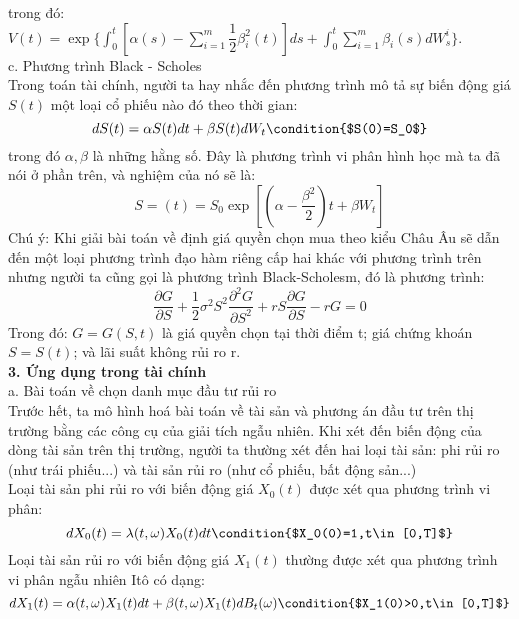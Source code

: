 \documentclass[12pt,a4paper]{article}
\begin{document}
trong đó: $V(t)=\exp\{\int_{0}^{t}[\alpha(s)-\sum_{i=1}^{m}\dfrac{1}{2}\beta_i^2(t)]ds+\int_{0}^{t}\sum_{i=1}^{m}\beta_i(s)dW_s^i \}$.\\
c. Phương trình Black - Scholes\\
Trong toán tài chính, người ta hay nhắc đến phương trình mô tả sự biến động giá $S(t)$ một loại cổ phiếu nào đó theo thời gian:
\begin{equation*}
	dS(t)=\alpha S(t)dt+\beta S(t)dW_t \condition{$S(0)=S_0$}
\end{equation*}
trong đó $\alpha,\beta$ là những hằng số. Đây là phương trình vi phân hình học mà ta đã nói ở phần trên, và nghiệm của nó sẽ là:
\begin{equation*}
	S=(t)=S_0\exp\left[\left(\alpha-\dfrac{\beta^2}{2} \right)t+\beta W_t \right]
\end{equation*}
Chú ý: Khi giải bài toán về định giá quyền chọn mua theo kiểu Châu Âu sẽ dẫn đến một loại phương trình đạo hàm riêng cấp hai khác với phương trình trên nhưng người ta cũng gọi là phương trình Black-Scholesm, đó là phương trình:
\begin{equation*}
	\dfrac{\partial G}{\partial S}+\dfrac{1}{2}\sigma^2S^2\dfrac{\partial^2G}{\partial S^2}+rS\dfrac{\partial G}{\partial S}-rG=0
\end{equation*}
Trong đó: $G=G(S,t)$ là giá quyền chọn tại thời điểm t; giá chứng khoán $S=S(t)$; và lãi suất không rủi ro r.\\
\textbf{3. Ứng dụng trong tài chính}\\
a. Bài toán về chọn danh mục đầu tư rủi ro\\
Trước hết, ta mô hình hoá bài toán về tài sản và phương án đầu tư trên thị trường bằng các công cụ của giải tích ngẫu nhiên. Khi xét đến biến động của dòng tài sản trên thị trường, người ta thường xét đến hai loại tài sản: phi rủi ro (như trái phiếu...) và tài sản rủi ro (như cổ phiếu, bất động sản...)\\
Loại tài sản phi rủi ro với biến động giá $X_0(t)$ được xét qua phương trình vi phân:
\begin{equation*}
	dX_0(t)=\lambda(t,\omega)X_0(t)dt \condition{$X_0(0)=1,t\in[0,T]$}
\end{equation*}
Loại tài sản rủi ro với biến động giá $X_1(t)$ thường được xét qua phương trình vi phân ngẫu nhiên Itô có dạng:
\begin{equation}\label{eq:ud1}
	dX_1(t)=\alpha(t,\omega)X_1(t)dt+\beta(t,\omega)X_1(t)dB_t(\omega) \condition{$X_1(0)>0,t\in[0,T]$}
\end{equation}
\end{document}
